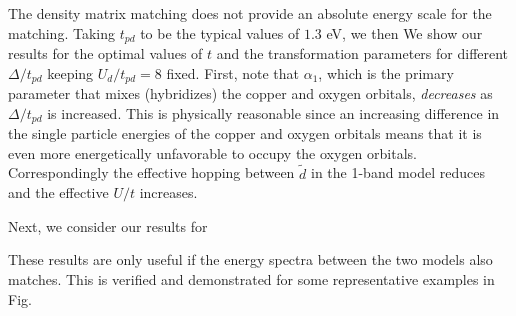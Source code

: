\documentclass[prl,12pt,onecolumn,nofootinbib,notitlepage,english,superscriptaddress]{revtex4-1}
\begin{document}
The density matrix matching does not provide an absolute energy scale for the matching. 
Taking $t_{pd}$ to be the typical values of $1.3$ eV, we then 
We show our results for the optimal values of $t$ and the transformation parameters for different $\Delta/t_{pd}$
keeping $U_d/t_{pd}=8$ fixed. First, note that $\alpha_1$, which is the primary parameter that mixes (hybridizes) 
the copper and oxygen orbitals, \emph{decreases} as $\Delta/t_{pd}$ is increased. This is physically reasonable 
since an increasing difference in the single particle energies of the copper and oxygen orbitals 
means that it is even more energetically unfavorable to occupy the oxygen orbitals. 
Correspondingly the effective hopping between $\tilde{d}$ in the 
1-band model reduces and the effective $U/t$ increases. 

Next, we consider our results for  

These results are only useful if the energy spectra between the two models also matches. This is verified 
and demonstrated for some representative examples in Fig.        
\end{document}
